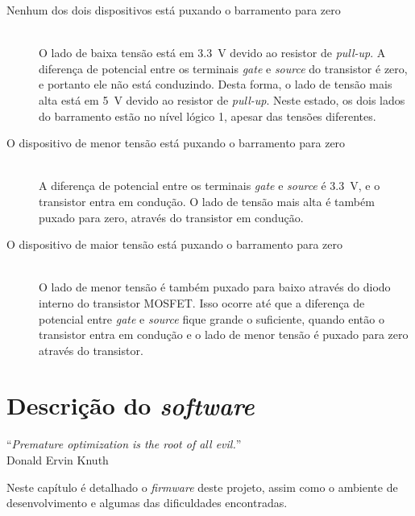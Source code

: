 \documentclass[brazil,pagestart=firstchapter]{abnt}
\begin{document}
\begin{description}
\item[Nenhum dos dois dispositivos está puxando o barramento para zero] \hfill \\
	O lado de baixa tensão está em \SI{3.3}{\volt} devido ao resistor de
	\textit{pull-up}. A diferença de potencial entre os terminais
	\textit{gate} e \textit{source} do transistor é zero, e portanto ele não
	está conduzindo. Desta forma, o lado de tensão mais alta está em
	\SI{5}{\volt} devido ao resistor de \textit{pull-up}. Neste estado, os
	dois lados do barramento estão no nível lógico 1, apesar das tensões
	diferentes.

\item[O dispositivo de menor tensão está puxando o barramento para zero] \hfill \\
	A diferença de potencial entre os terminais \textit{gate} e
	\textit{source} é \SI{3.3}{\volt}, e o transistor entra em condução. O
	lado de tensão mais alta é também puxado para zero, através do
	transistor em condução.

\item[O dispositivo de maior tensão está puxando o barramento para zero] \hfill \\
	O lado de menor tensão é também puxado para baixo através do diodo
	interno do transistor MOSFET. Isso ocorre até que a diferença de potencial
	entre \textit{gate} e \textit{source} fique grande o suficiente, quando
	então o transistor entra em condução e o lado de menor tensão é puxado
	para zero através do transistor.

\end{description}


\chapter{Descrição do \textit{software}}
\label{cap:software}


\vfill{}
\begin{flushright}{}
``\emph{Premature optimization is the root of all evil.}''\\
{\small Donald Ervin Knuth}
\end{flushright}{\small \par}
\vfill{}

Neste capítulo é detalhado o \textit{firmware} deste projeto, assim como o
ambiente de desenvolvimento e algumas das dificuldades encontradas.
\newpage
\end{document}
